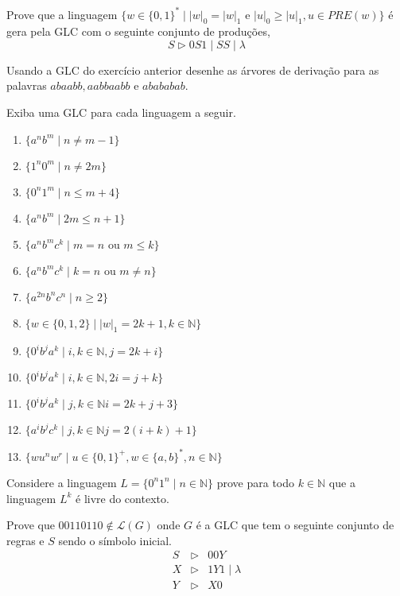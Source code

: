 \begin{problemset}
    \item Prove que a linguagem $\{ w \in \{0, 1\}^* \mid |w|_0 = |w|_1 \text{ e } |u|_0 \geq |u|_1, u \in PRE(w)\}$ é gera pela GLC com o seguinte conjunto de produções,
    \begin{equation}
        S \rhd 0S1 \mid SS \mid \lambda
    \end{equation}
    
    \item Usando a GLC do exercício anterior desenhe as árvores de derivação para as palavras $abaabb, aabbaabb$ e $abababab$.
    
    \item Exiba uma GLC para cada linguagem a seguir.
    \begin{enumerate}
        \item $\{a^nb^m \mid n \neq m - 1\}$
        \item $\{1^n0^m \mid n \neq 2m\}$
        \item $\{0^n1^m \mid n \leq m + 4\}$
        \item $\{a^nb^m \mid 2m \leq n + 1\}$
        \item $\{a^nb^mc^k \mid m = n \text{ ou } m \leq k\}$
        \item $\{a^nb^mc^k \mid k = n \text{ ou } m \neq n\}$
        \item $\{a^{2n}b^{n}c^{n} \mid n \geq 2\}$
        \item $\{w \in \{0, 1, 2\} \mid |w|_1 = 2k + 1, k \in \mathbb{N}\}$
        \item $\{0^ib^ja^k \mid i, k \in \mathbb{N},  j = 2k + i\}$
        \item $\{0^ib^ja^k \mid i, k \in \mathbb{N}, 2i = j + k\}$
        \item $\{0^ib^ja^k \mid j, k \in \mathbb{N} i = 2k + j + 3\}$
        \item $\{a^ib^jc^k \mid j, k \in \mathbb{N} j = 2(i + k) + 1\}$
        \item $\{wu^nw^r \mid u \in \{0, 1\}^+, w \in \{a, b\}^*, n \in \mathbb{N}\}$
    \end{enumerate}
    
    \item Considere a linguagem $L =\{0^n1^n \mid n \in \mathbb{N}\}$ prove para todo $k \in \mathbb{N}$ que a linguagem $L^k$ é livre do contexto.
    
    \item Prove que $00110110 \notin \mathcal{L}(G)$ onde $G$ é a GLC que tem o seguinte conjunto de regras e $S$ sendo o símbolo inicial.
    \begin{eqnarray*}
        S & \rhd & 00Y\\
        X & \rhd & 1Y1 \mid \lambda\\
        Y & \rhd & X0
    \end{eqnarray*}
    

\end{problemset}
